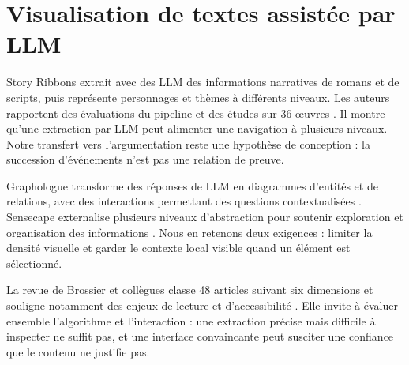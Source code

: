 \section{Visualisation de textes assistée par LLM}
Story Ribbons extrait avec des LLM des informations narratives de romans et de scripts, puis représente personnages et thèmes à différents niveaux. Les auteurs rapportent des évaluations du pipeline et des études sur 36 œuvres \cite{ref01}. Il montre qu'une extraction par LLM peut alimenter une navigation à plusieurs niveaux. Notre transfert vers l'argumentation reste une hypothèse de conception : la succession d'événements n'est pas une relation de preuve.

Graphologue transforme des réponses de LLM en diagrammes d'entités et de relations, avec des interactions permettant des questions contextualisées \cite{ref02}. Sensecape externalise plusieurs niveaux d'abstraction pour soutenir exploration et organisation des informations \cite{ref03}. Nous en retenons deux exigences : limiter la densité visuelle et garder le contexte local visible quand un élément est sélectionné.

La revue de Brossier et collègues classe 48 articles suivant six dimensions et souligne notamment des enjeux de lecture et d'accessibilité \cite{ref04}. Elle invite à évaluer ensemble l'algorithme et l'interaction : une extraction précise mais difficile à inspecter ne suffit pas, et une interface convaincante peut susciter une confiance que le contenu ne justifie pas.
